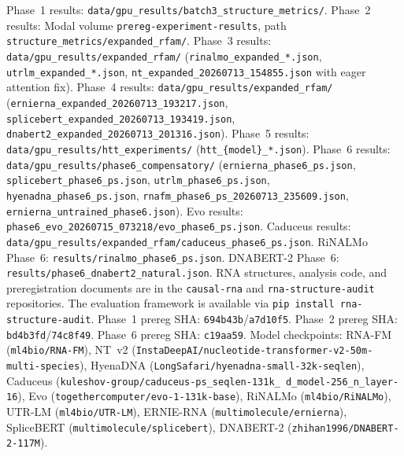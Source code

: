 \documentclass[11pt]{article}
\begin{document}
Phase~1 results: \texttt{data/gpu\_results/batch3\_structure\_metrics/}.
Phase~2 results: Modal volume \texttt{prereg-experiment-results},
path \texttt{structure\_metrics/expanded\_rfam/}.
Phase~3 results: \texttt{data/gpu\_results/expanded\_rfam/}
(\texttt{rinalmo\_expanded\_*.json}, \texttt{utrlm\_expanded\_*.json},
\texttt{nt\_expanded\_20260713\_154855.json} with eager attention fix).
Phase~4 results: \texttt{data/gpu\_results/expanded\_rfam/}
(\texttt{ernierna\_expanded\_20260713\_193217.json},
\texttt{splicebert\_expanded\_20260713\_193419.json},
\texttt{dnabert2\_expanded\_20260713\_201316.json}).
Phase~5 results: \texttt{data/gpu\_results/htt\_experiments/}
(\texttt{htt\_\{model\}\_*.json}).
Phase~6 results: \texttt{data/gpu\_results/phase6\_compensatory/}
(\texttt{ernierna\_phase6\_ps.json},
\texttt{splicebert\_phase6\_ps.json},
\texttt{utrlm\_phase6\_ps.json},
\texttt{hyenadna\_phase6\_ps.json},
\texttt{rnafm\_phase6\_ps\_20260713\_235609.json},
\texttt{ernierna\_untrained\_phase6.json}).
Evo results: \texttt{phase6\_evo\_20260715\_073218/evo\_phase6\_ps.json}.
Caduceus results: \texttt{data/gpu\_results/expanded\_rfam/caduceus\_phase6\_ps.json}.
RiNALMo Phase~6: \texttt{results/rinalmo\_phase6\_ps.json}.
DNABERT-2 Phase~6: \texttt{results/phase6\_dnabert2\_natural.json}.
RNA structures, analysis code, and preregistration documents are in
the \texttt{causal-rna} and \texttt{rna-structure-audit}
repositories.  The evaluation framework is available via
\texttt{pip install rna-structure-audit}.
Phase~1 prereg SHA: \texttt{694b43b}/\texttt{a7d10f5}.
Phase~2 prereg SHA: \texttt{bd4b3fd}/\texttt{74c8f49}.
Phase~6 prereg SHA: \texttt{c19aa59}.
Model checkpoints: RNA-FM (\texttt{ml4bio/RNA-FM}), NT~v2
(\texttt{InstaDeepAI/nucleotide-transformer-v2-50m-multi-species}),
HyenaDNA (\texttt{LongSafari/hyenadna-small-32k-seqlen}),
Caduceus (\texttt{kuleshov-group/caduceus-ps\_seqlen-131k\_%
d\_model-256\_n\_layer-16}),
Evo (\texttt{togethercomputer/evo-1-131k-base}),
RiNALMo (\texttt{ml4bio/RiNALMo}),
UTR-LM (\texttt{ml4bio/UTR-LM}),
ERNIE-RNA (\texttt{multimolecule/ernierna}),
SpliceBERT (\texttt{multimolecule/splicebert}),
DNABERT-2 (\texttt{zhihan1996/DNABERT-2-117M}).



\end{document}
